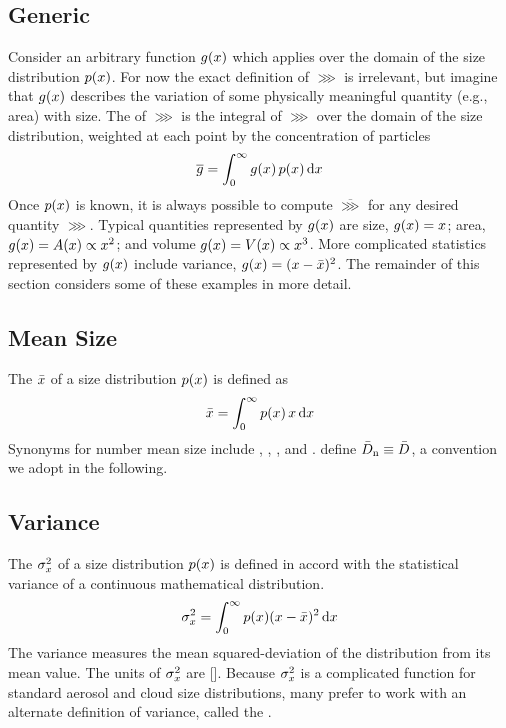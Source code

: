\documentclass[12pt,twoside]{article}
\newcommand{\gggavg}{\overline{\ggg}}
\newcommand{\vrnxxx}{\sdn_{\xxx}^{2}}
\begin{document}
\subsection[Generic]{Generic}
Consider an arbitrary function $g(x)$ which applies over the
domain of the size distribution $p(x)$.
For now the exact definition of $\ggg$ is irrelevant, but imagine that
$g(x)$ describes the variation of some physically meaningful
quantity (e.g., area) with size.
The  of $\ggg$ is the integral of $\ggg$ over the
domain of the size distribution, weighted at each point by the
concentration of particles
\begin{equation}
\gggavg = \int_{0}^{\infty} \ggg(\xxx) \, \pdffnc(\xxx) \,\dfr\xxx
\label{eqn:stt_gnr}
\end{equation}
Once $p(x)$ is known, it is always possible to compute
$\gggavg$ for any desired quantity $\ggg$.
Typical quantities represented by $g(x)$ are size,
$g(x) = x$; area, $g(x) = A(x) \propto x^{2}$; and
volume $g(x) = V(x) \propto x^{3}$.
More complicated statistics represented by $g(x)$ include
variance, $g(x) = (x - \bar{x})^{2}$. 
The remainder of this section considers some of these examples in more
detail.

\subsection[Mean Size]{Mean Size}
The  $\bar{x}$ of a size distribution
$p(x)$ is defined as 
\begin{equation}
\bar{x} = \int_{0}^{\infty} p(x) \, x \,\mathrm{d}x
\label{eqn:szavg_gnr}
\end{equation}
Synonyms for number mean size include ,
, , and
 \cite[][]{HaT74}.  
\cite{FTV89} define $\bar{D}_{\mathrm{n}} \equiv \bar{D}$, a convention we adopt
in the following.

\subsection[Variance]{Variance}\label{sxn:vrn}
The  $\vrnxxx$ of a size distribution $p(x)$
is defined in accord with the statistical variance of a continuous
mathematical distribution.
\begin{equation}
\vrnxxx = 
\int_{0}^{\infty} \pdffnc(\xxx) (\xxx - \xxxavg)^{2} \,\dfr\xxx
\label{eqn:vrn_gnr}
\end{equation}
The variance measures the mean squared-deviation of the distribution
from its mean value.
The units of $\vrnxxx$ are [\mS].
Because $\vrnxxx$ is a complicated function for standard aerosol and
cloud size distributions, many prefer to work with an alternate
definition of variance, called the . 
\end{document}
